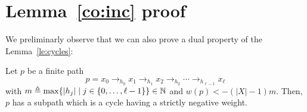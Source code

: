 \section{Lemma~\ref{co:inc} proof}\label{ap:proof}
We preliminarly observe that we can also prove a dual property of the
Lemma~\ref{le:cycles}:

\begin{lemma}\label{le:cyclesn}
  Let \(p\) be a finite path
  \[p = x_0 \to_{h_0} x_1 \to_{h_1} x_2 \to_{h_2} \cdots \to_{h_{\ell-1}} x_{\ell}\]
  with
  \(m \triangleq \max \{ |h_j| \mid j \in \{0, \ldots, \ell-1\}\}\in \mathbb{N}\) and 
  \(w(p) < -(|X|-1)m\). Then, \(p\) has a subpath which is a cycle having a 
  strictly negative weight.
\end{lemma}

